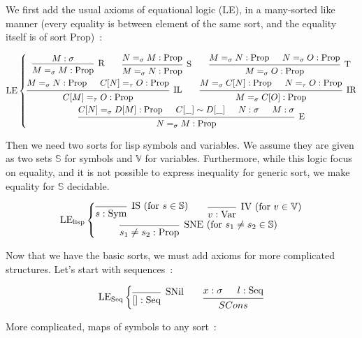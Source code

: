 \documentclass[]{article}
\newcommand{\V}{\mathscr{V}}
\newcommand{\1}{\mathbbm{1}}
\newcommand{\0}{\mathbbm{0}}
\renewcommand{\S}{\mathbb{S}}
\renewcommand{\V}{\mathbb{V}}
\newcommand{\Prop}{\text{Prop}}
\newcommand{\Sym}{\text{Sym}}
\newcommand{\Var}{\text{Var}}
\newcommand{\Seq}{\text{Seq}}
\newcommand{\proof}[1]{{\scantokens{\begin{prooftree}#1\end{prooftree}}}}
\begin{document}
We first add the usual axioms of equational logic (LE),
in a many-sorted like manner (every equality is between element
of the same sort, and the equality itself is of sort $\Prop$)~:

\[\text{LE}\left\{
\begin{gathered}
\proof{
    \hypo{M : \sigma}
    \infer1[R]{M =_\sigma M : \Prop}
}
\qquad\proof{
    \hypo{ N =_\sigma M : \Prop }
    \infer1[S]{M =_\sigma N : \Prop}
}
\qquad\proof{
    \hypo{M=_\sigma N : \Prop}
    \hypo{N=_\sigma O : \Prop}
    \infer2[T]{M=_\sigma O : \Prop}
} \\
\proof{
    \hypo{M=_\sigma N:\Prop}
    \hypo{C[N]=_\tau O:\Prop}
    \infer2[IL]{C[M]=_\tau O : \Prop}
}
\qquad\proof{
    \hypo{M =_\sigma C[N]:\Prop}
    \hypo{N =_\tau O:\Prop}
    \infer2[IR]{M =_\sigma C[O]:\Prop}
} \\
\proof{
    \hypo{C[N]=_\sigma D[M]:\Prop}
    \hypo{C[\_]\sim D[\_]}
    \hypo{N:\sigma}
    \hypo{M:\sigma}
    \infer4[E]{N=_\sigma M:\Prop}
}
\end{gathered}
\right.
\]

Then we need two sorts for lisp symbols and variables. We assume they
are given as two sets $\S$ for symbols and $\V$ for variables.
Furthermore, while this logic focus on equality, and it is not possible
to express inequality for generic sort, we make equality for $\S$
decidable.

\[\text{LE}_\text{lisp}\left\{
    \begin{gathered}
        \proof{
            \infer0[IS (for $s\in\S$)]{s : \Sym}
        }
        \qquad\proof{
            \infer0[IV (for $v\in\V)$]{v : \Var}
        }\\
        \proof{
            \infer0[SNE (for $s_1\neq s_2\in\S$)]{s_1\neq s_2:\Prop}
        }
    \end{gathered}
\right.\]

Now that we have the basic sorts, we must add axioms for more complicated
structures. Let's start with sequences~:

\[\text{LE}_\text{Seq}\left\{
    \begin{gathered}
        \proof{
            \infer0[SNil]{[]:\Seq}
        }
        \qquad\proof{
            \hypo{x:\sigma}
            \hypo{l:\Seq}
            \infer2{SCons}{x::l : \Seq}
        }
    \end{gathered}
\right.\]

More complicated, maps of symbols to any sort~:
\end{document}

